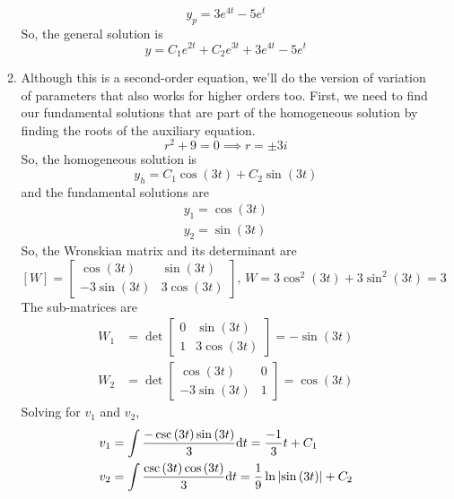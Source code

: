 \begin{enumerate}[label=\arabic*.]
\begin{enumerate}[label=(\alph*)]
\begin{equation*}
					y_p = 3e^{4t} - 5e^{t}
				\end{equation*}
				So, the general solution is
				\begin{equation*}
					y = C_1e^{2t} + C_2e^{3t} + 3e^{4t} - 5e^{t}
				\end{equation*}
			\item
				Although this is a second-order equation, we'll do the version of variation of parameters that also works for higher orders too. First, we need to find our fundamental solutions that are part of the homogeneous solution by finding the roots of the auxiliary equation.
				\begin{equation*}
					r^2 + 9 = 0 \implies r = \pm 3i
				\end{equation*}
				So, the homogeneous solution is
				\begin{equation*}
					y_h = C_1\cos{(3t)} + C_2\sin{(3t)}
				\end{equation*}
				and the fundamental solutions are
				\begin{align*}
					y_1 = \cos{(3t)} \\
					y_2 = \sin{(3t)}
				\end{align*}
				So, the Wronskian matrix and its determinant are
				\begin{equation*}
					\left[W\right] = \begin{bmatrix}
						\cos{(3t)} & \sin{(3t)} \\
						-3\sin{(3t)} & 3\cos{(3t)}
					\end{bmatrix} \text{, } W = 3\cos^2{(3t)} + 3\sin^2{(3t)} = 3
				\end{equation*}
				The sub-matrices are
				\begin{align*}
					W_1 &= \det\begin{bmatrix}
						0 & \sin{(3t)} \\
						1 & 3\cos{(3t)}
					\end{bmatrix} = -\sin{(3t)} \\
					 W_2 &= \det\begin{bmatrix}
						\cos{(3t)} & 0 \\
						-3\sin{(3t)} & 1
					\end{bmatrix} = \cos{(3t)}
				\end{align*}
				Solving for $v_1$ and $v_2$,
				\begin{align*}
					v_1 &= \int{\frac{-\csc{(3t)}\sin{(3t)}}{3} \mathrm{d}t} = \frac{-1}{3}t + C_1 \\
					v_2 &= \int{\frac{\csc{(3t)}\cos{(3t)}}{3} \mathrm{d}t} = \frac{1}{9}\ln{\abs{\sin{(3t)}}} + C_2

\end{align*}
\end{enumerate}
\end{enumerate}
